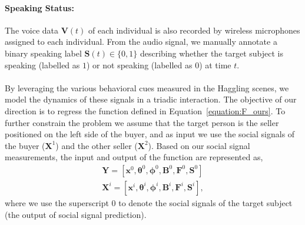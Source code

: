 \paragraph{Speaking Status:} The voice data $\mathbf{V}(t)$ of each individual is also recorded by wireless microphones assigned to each individual. From the audio signal, we manually annotate a binary speaking label $\mathbf{S}(t) \in \{0,1\}$ describing whether the target subject is speaking (labelled as $1$) or not speaking (labelled as $0$) at time $t$.\\%
\mbox{ }\\
By leveraging the various behavioral cues measured in the Haggling scenes, we model the dynamics of these signals in a triadic interaction. The objective of our direction is to regress the function defined in Equation~\ref{equation:F_ours}. To further constrain the problem we assume that the target person is the seller positioned on the left side of the buyer, and as input we use the social signals of the buyer ($\mathbf{X}^1$) and the other seller ($\mathbf{X}^2$). Based on our social signal measurements, the input and output of the function are represented as,
\begin{equation}
\begin{gathered}
\mathbf{Y} = [ \mathbf{x}^0, \boldsymbol{\theta}^0, \boldsymbol{\phi}^0, \mathbf{B}^0, \mathbf{F}^0, \mathbf{S}^0 ]\\
\mathbf{X}^i = [ \mathbf{x}^i, \boldsymbol{\theta}^i, \boldsymbol{\phi}^i, \mathbf{B}^i, \mathbf{F}^i, \mathbf{S}^i ],
\end{gathered}
\end{equation}
where we use the superscript 0 to denote the social signals of the target subject (the output of social signal prediction). 


